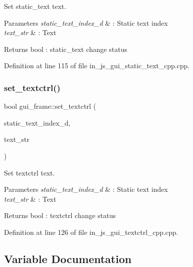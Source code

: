 Set static\+\_\+text text. 


\begin{DoxyParams}{Parameters}
{\em static\+\_\+text\+\_\+index\+\_\+d} & \+: Static text index \\
\hline
{\em text\+\_\+str} & \+: Text \\
\hline
\end{DoxyParams}
\begin{DoxyReturn}{Returns}
bool \+: static\+\_\+text change status 
\end{DoxyReturn}


Definition at line 115 of file in\+\_\+js\+\_\+gui\+\_\+static\+\_\+text\+\_\+cpp.\+cpp.

\mbox{\label{group___static__text_ga2508cd9160297f7afcaca833d287e7e0}} 
\subsubsection{set\_textctrl()}
{\footnotesize\ttfamily bool gui\+\_\+frame\+::set\+\_\+textctrl (\begin{DoxyParamCaption}\item[{double}]{static\+\_\+text\+\_\+index\+\_\+d,  }\item[{wx\+String}]{text\+\_\+str }\end{DoxyParamCaption})}



Set textctrl text. 


\begin{DoxyParams}{Parameters}
{\em static\+\_\+text\+\_\+index\+\_\+d} & \+: Static text index \\
\hline
{\em text\+\_\+str} & \+: Text \\
\hline
\end{DoxyParams}
\begin{DoxyReturn}{Returns}
bool \+: textctrl change status 
\end{DoxyReturn}


Definition at line 126 of file in\+\_\+js\+\_\+gui\+\_\+textctrl\+\_\+cpp.\+cpp.



\subsection{Variable Documentation}
\mbox{\label{group___static__text_ga3182f133a872d9df1f836e8210e1f9d2}} 
